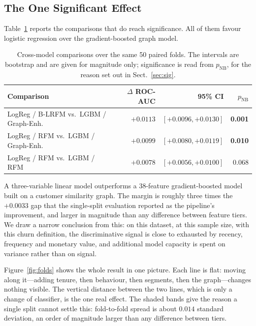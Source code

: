 \documentclass[runningheads]{llncs}
\begin{document}
\subsection{The One Significant Effect}

Table~\ref{tab:cross} reports the comparisons that do reach significance. All of
them favour logistic regression over the gradient-boosted graph model.

\begin{table}[t]
\centering
\caption{Cross-model comparisons over the same 50 paired folds. The intervals are
bootstrap and are given for magnitude only; significance is read from
$p_{\mathrm{NB}}$, for the reason set out in Sect.~\ref{sec:sig}.}
\label{tab:cross}
\begin{tabular}{lrrr}
\toprule
Comparison & $\Delta$ ROC-AUC & 95\% CI & $p_{\mathrm{NB}}$ \\
\midrule
LogReg / B-LRFM vs.\ LGBM / Graph-Enh. & $+0.0113$ & $[+0.0096, +0.0130]$ & \textbf{0.001} \\
LogReg / RFM vs.\ LGBM / Graph-Enh. & $+0.0099$ & $[+0.0080, +0.0119]$ & \textbf{0.010} \\
LogReg / RFM vs.\ LGBM / RFM & $+0.0078$ & $[+0.0056, +0.0100]$ & 0.068 \\
\bottomrule
\end{tabular}
\end{table}

A three-variable linear model outperforms a 38-feature gradient-boosted model
built on a customer similarity graph. The margin is roughly three times the
$+0.0033$ gap that the single-split evaluation reported as the pipeline's
improvement, and larger in magnitude than any difference between feature tiers.
We draw a narrow conclusion from this: on this dataset, at this sample size, with
this churn definition, the discriminative signal is close to exhausted by
recency, frequency and monetary value, and additional model capacity is spent on
variance rather than on signal.

Figure~\ref{fig:folds} shows the whole result in one picture. Each line is flat:
moving along it---adding tenure, then behaviour, then segments, then the
graph---changes nothing visible. The vertical distance between the two lines,
which is only a change of classifier, is the one real effect. The shaded bands
give the reason a single split cannot settle this: fold-to-fold spread is about
$0.014$ standard deviation, an order of magnitude larger than any difference
between tiers.
\end{document}
